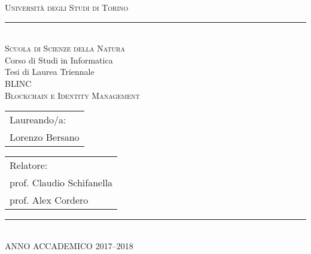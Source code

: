 \thispagestyle{empty}
\setcounter{page}{0}

\begin{center}
\Large
\textsc{Universit\`a degli Studi di Torino}\\
\vspace{-0.4cm}
\rule{\textwidth}{0.1mm}\\
\large
\textsc{Scuola di Scienze della Natura}\\ 
\bigskip
Corso di Studi in Informatica \\
\vfill %
Tesi di Laurea Triennale \\
\vfill %
\Large
\textsc{BLINC}\\
\textsc{Blockchain e Identity Management}
\end{center}
\vfill
\begin{tabular}[t]{l}
Laureando/a:\\
Lorenzo Bersano
\end{tabular}
\hfill 
\begin{tabular}[t]{l}
Relatore: \\
prof. Claudio Schifanella \\
prof. Alex Cordero
\end{tabular}
\vfill
\begin{center}
\normalsize
\rule{8cm}{0.1mm}\\
\bigskip
ANNO ACCADEMICO 2017--2018
\end{center}
